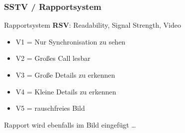 \begin{frame}
  \frametitle{SSTV / Rapportsystem}


  Rapportsystem \textbf{RSV}\hyperlink{refs}{\cite{bv12}}: Readability, Signal Strength, Video

  \begin{itemize}
    \item V1 = Nur Synchronisation zu sehen
    \item V2 = Großes Call lesbar
    \item V3 = Große Details zu erkennen
    \item V4 = Kleine Details zu erkennen
    \item V5 = rauschfreies Bild
  \end{itemize}

  \bigskip

  Rapport wird ebenfalls im Bild eingefügt \dots

\end{frame}

